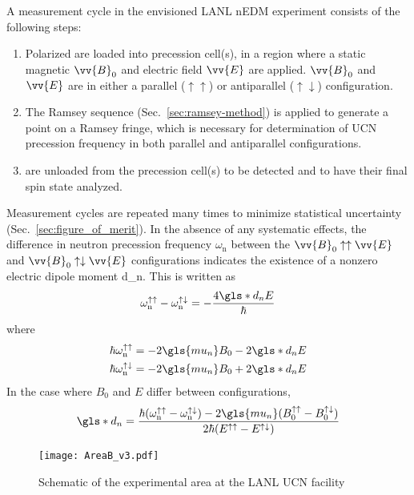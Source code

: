 A measurement cycle in the envisioned LANL nEDM experiment consists of the following steps: 
%
\begin{enumerate}
    \item Polarized \ucn are loaded into precession cell(s), in a region where a static magnetic $\vv{B}_0$ and electric field $\vv{E}$ are applied. $\vv{B}_0$ and $\vv{E}$ are in either a parallel ($\uparrow\uparrow$) or antiparallel ($\uparrow\downarrow$) configuration.
    \item The Ramsey sequence (Sec.~\ref{sec:ramsey-method}) is applied to generate a point on a Ramsey fringe, which is necessary for determination of UCN precession frequency in both parallel and antiparallel configurations.
    \item \ucn are unloaded from the precession cell(s) to be detected and to have their final spin state analyzed.
\end{enumerate}
%
Measurement cycles are repeated many times to minimize statistical uncertainty (Sec.~\ref{sec:figure_of_merit}). In the absence of any systematic effects, the difference in neutron precession frequency $\omega_\text{n}$ between the $\vv{B}_0\uparrow\uparrow\vv{E}$ and $\vv{B}_0\uparrow\downarrow\vv{E}$ configurations indicates the existence of a nonzero electric dipole moment \gls*{d_n}. This is written as
%
\begin{gather}
    \omega_\text{n}^{\uparrow\uparrow} - \omega_\text{n}^{\uparrow\downarrow} = -\frac{4\gls*{d_n}E}{\hbar}\label{eq:delta_omega_dipole_relation}
\end{gather}
%
where
%
\begin{align}
    \hbar \omega_\text{n}^{\uparrow\uparrow} &= -2\gls{mu_n}B_0 - 2\gls*{d_n}E\\
    \hbar \omega_\text{n}^{\uparrow\downarrow} &= -2\gls{mu_n}B_0 + 2\gls*{d_n}E
\end{align}
%
In the case where $B_0$ and $E$ differ between configurations,
%
\begin{gather}
    \gls*{d_n}=\frac{\hbar(\omega_\text{n}^{\uparrow\uparrow} - \omega_\text{n}^{\uparrow\downarrow})-2\gls{mu_n}(B_0^{\uparrow\uparrow} - B_0^{\uparrow\downarrow})}{2\hbar(E^{\uparrow\uparrow} - E^{\uparrow\downarrow})}
\end{gather}
%
\begin{figure}[htp]
    \centering
    \texttt{[image: AreaB\_v3.pdf]}
    \caption{Schematic of the experimental area at the LANL UCN facility}
    \label{fig:AreaB_schematic}
\end{figure}


